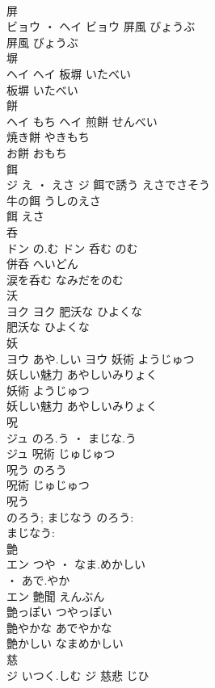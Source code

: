 \documentclass[8pt]{extreport}
\begin{document}
\begin{CJK}{UTF8}{min}
\\	屏	
\\	ビョウ ・ ヘイ		ビョウ	屏風	びょうぶ	
\\	屏風	びょうぶ	
\\	塀	
\\	ヘイ		ヘイ	板塀	いたべい	
\\	板塀	いたべい	
\\	餅	
\\	ヘイ	もち	ヘイ	煎餅	せんべい	
\\	焼き餅	やきもち	
\\	お餅	おもち	
\\	餌	
\\	ジ	え ・ えさ	ジ	餌で誘う	えさでさそう	
\\	牛の餌	うしのえさ	
\\	餌	えさ	
\\	呑	
\\	ドン	の.む	ドン	呑む	のむ	
\\	併呑	へいどん	
\\	涙を呑む	なみだをのむ	
\\	沃	
\\	ヨク		ヨク	肥沃な	ひよくな	
\\	肥沃な	ひよくな	
\\	妖	
\\	ヨウ	あや.しい	ヨウ	妖術	ようじゅつ	
\\	妖しい魅力	あやしいみりょく	
\\	妖術	ようじゅつ	
\\	妖しい魅力	あやしいみりょく	
\\	呪	
\\	ジュ	のろ.う ・ まじな.う
\\	ジュ	呪術	じゅじゅつ	
\\	呪う	のろう	
\\	呪術	じゅじゅつ	
\\	呪う 
\\	のろう; まじなう	のろう: 
\\	まじなう: 
\\	艶	
\\	エン	つや ・ なま.めかしい
\\	・ あで.やか
\\	エン	艶聞	えんぶん	
\\	艶っぽい	つやっぽい	
\\	艶やかな	あでやかな	
\\	艶かしい	なまめかしい	
\\	慈	
\\	ジ	いつく.しむ	ジ	慈悲	じひ	

\end{CJK}
\end{document}
